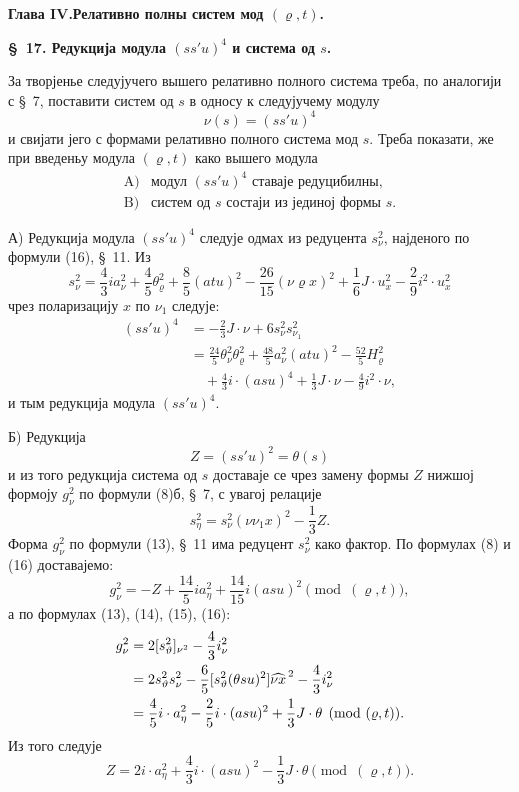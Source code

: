﻿\documentclass[11pt]{article}
\let\A\relax
\newcommand{\A}{\mathfrak A}
\begin{document}
\begin{center}
{\Large\bfseries Глава IV.\quad Релативно полны систем мод $(\varrho,t)$.}
\end{center}

\begin{center}
\textbf{\S\ 17. \quad Редукција модула $(ss'u)^4$ и система од $s$.}
\end{center}

За творјенье следујучего вышего релативно полного система треба, по аналогији с \S\ 7, поставити систем од $s$ в односу к следујучему модулу
\[
\nu(s)=(ss'u)^4
\]
и свијати јего с формами релативно полного система мод $s$. Треба показати, же при введеньу модула $(\varrho,t)$ како вышего модула
\[
\begin{array}{ll}
\mathrm{A)}&\text{модул }(ss'u)^4\text{ ставаје редуцибилны,}\\
\mathrm{B)}&\text{систем од }s\text{ состаји из јединој формы }s.
\end{array}
\]

\noindent А) Редукција модула $(ss'u)^4$ следује одмах из редуцента $s_\nu^2$, најденого по формули (16), \S\ 11. Из
\[
 s_\nu^2=\frac43 i a_\nu^2+\frac45\theta_\varrho^2+\frac85(atu)^2-
 \frac{26}{15}(\nu\varrho x)^2+\frac16J\cdot u_x^2-
 \frac29i^2\cdot u_x^2
\]
чрез поларизацију $x$ по $\nu_1$ следује:
\[
\tag{21}
\begin{aligned}
(ss'u)^4&=-\frac23J\cdot\nu+6s_\nu^2s_{\nu_1}^2\\
&=\frac{24}{5}\theta_\nu^2\theta_\varrho^2+
\frac{48}{5}a_\nu^2(atu)^2-
\frac{52}{5}H_\varrho^2\\
&\quad+\frac43i\cdot(asu)^4+\frac13J\cdot\nu-
\frac49i^2\cdot\nu,
\end{aligned}
\]
и тым редукција модула $(ss'u)^4$.


\noindent Б) Редукција
\[
Z=(ss'u)^2=\theta(s)
\]
и из того редукција система од $s$ доставаје се чрез замену формы $Z$ нижшој формоју $g_\nu^2$ по формули (8)б, \S\ 7, с увагој релације
\[
 s_\eta^2=s_\nu^2(\nu\nu_1x)^2-\frac13Z.
\]
Форма $g_\nu^2$ по формули (13), \S\ 11 има редуцент $s_\nu^2$ како фактор. По формулах (8) и (16) доставајемо:
\[
 g_\nu^2=-Z+\frac{14}{5}ia_\eta^2+\frac{14}{15}i(asu)^2
 \pmod{(\varrho,t)},
\]
а по формулах (13), (14), (15), (16):
\[
\begin{aligned}
g_\nu^2&=2[s_\vartheta^2]_{\nu^2}-\frac43 i\A_\nu^2\\
&=2s_\vartheta^2s_\nu^2-\frac65[s_\vartheta^2(\theta su)^2]\widehat{\nu x}^{\,2}
        -\frac43i\A_\nu^2\\
&=\frac45i\cdot a_\eta^2-\frac25i\cdot(asu)^2+\frac13J\cdot\theta
\pmod{(\varrho,t)}.
\end{aligned}
\]
Из того следује
\[
\tag{23}
 Z=2i\cdot a_\eta^2+\frac43i\cdot(asu)^2-\frac13J\cdot\theta
 \pmod{(\varrho,t)}.
\]
\end{document}
